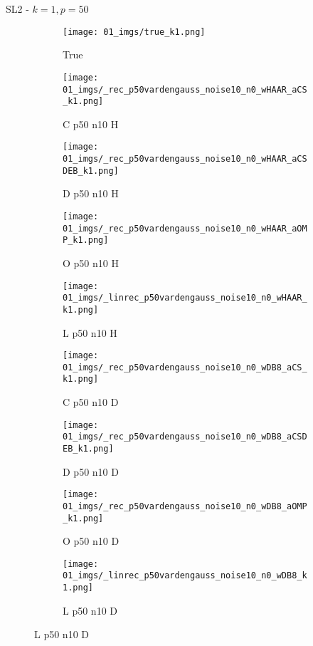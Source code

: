 \begin{frame}{SL2 - $k=1,p=50$}{}
\begin{figure}
\begin{subfigure}{0.1\textwidth}
\texttt{[image: 01\_imgs/true\_k1.png]}
\caption*{\Tiny True}
\end{subfigure}
\begin{subfigure}{0.1\textwidth}
\texttt{[image: 01\_imgs/\_rec\_p50vardengauss\_noise10\_n0\_wHAAR\_aCS\_k1.png]}
\caption*{\Tiny C p50 n10 H}
\end{subfigure}
\begin{subfigure}{0.1\textwidth}
\texttt{[image: 01\_imgs/\_rec\_p50vardengauss\_noise10\_n0\_wHAAR\_aCSDEB\_k1.png]}
\caption*{\Tiny D p50 n10 H}
\end{subfigure}
\begin{subfigure}{0.1\textwidth}
\texttt{[image: 01\_imgs/\_rec\_p50vardengauss\_noise10\_n0\_wHAAR\_aOMP\_k1.png]}
\caption*{\Tiny O p50 n10 H}
\end{subfigure}
\begin{subfigure}{0.1\textwidth}
\texttt{[image: 01\_imgs/\_linrec\_p50vardengauss\_noise10\_n0\_wHAAR\_k1.png]}
\caption*{\Tiny L p50 n10 H}
\end{subfigure}
\begin{subfigure}{0.1\textwidth}
\texttt{[image: 01\_imgs/\_rec\_p50vardengauss\_noise10\_n0\_wDB8\_aCS\_k1.png]}
\caption*{\Tiny C p50 n10 D}
\end{subfigure}
\begin{subfigure}{0.1\textwidth}
\texttt{[image: 01\_imgs/\_rec\_p50vardengauss\_noise10\_n0\_wDB8\_aCSDEB\_k1.png]}
\caption*{\Tiny D p50 n10 D}
\end{subfigure}
\begin{subfigure}{0.1\textwidth}
\texttt{[image: 01\_imgs/\_rec\_p50vardengauss\_noise10\_n0\_wDB8\_aOMP\_k1.png]}
\caption*{\Tiny O p50 n10 D}
\end{subfigure}
\begin{subfigure}{0.1\textwidth}
\texttt{[image: 01\_imgs/\_linrec\_p50vardengauss\_noise10\_n0\_wDB8\_k1.png]}
\caption*{\Tiny L p50 n10 D}
\end{subfigure}

\vspace{5pt}


\end{figure}
\end{frame}
